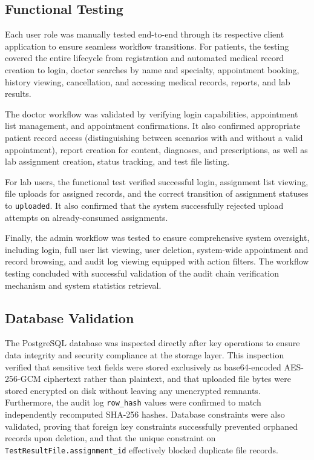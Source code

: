 \documentclass[a4paper,12pt]{report}
\begin{document}
\subsection{Functional Testing}
Each user role was manually tested end-to-end through its respective client application to ensure seamless workflow transitions. For patients, the testing covered the entire lifecycle from registration and automated medical record creation to login, doctor searches by name and specialty, appointment booking, history viewing, cancellation, and accessing medical records, reports, and lab results. 

The doctor workflow was validated by verifying login capabilities, appointment list management, and appointment confirmations. It also confirmed appropriate patient record access (distinguishing between scenarios with and without a valid appointment), report creation for content, diagnoses, and prescriptions, as well as lab assignment creation, status tracking, and test file listing. 

For lab users, the functional test verified successful login, assignment list viewing, file uploads for assigned records, and the correct transition of assignment statuses to \texttt{uploaded}. It also confirmed that the system successfully rejected upload attempts on already-consumed assignments. 

Finally, the admin workflow was tested to ensure comprehensive system oversight, including login, full user list viewing, user deletion, system-wide appointment and record browsing, and audit log viewing equipped with action filters. The workflow testing concluded with successful validation of the audit chain verification mechanism and system statistics retrieval.

\subsection{Database Validation}
The PostgreSQL database was inspected directly after key operations to ensure data integrity and security compliance at the storage layer. This inspection verified that sensitive text fields were stored exclusively as base64-encoded AES-256-GCM ciphertext rather than plaintext, and that uploaded file bytes were stored encrypted on disk without leaving any unencrypted remnants. Furthermore, the audit log \texttt{row\_hash} values were confirmed to match independently recomputed SHA-256 hashes. Database constraints were also validated, proving that foreign key constraints successfully prevented orphaned records upon deletion, and that the unique constraint on \texttt{TestResultFile.assignment\_id} effectively blocked duplicate file records.
\end{document}
